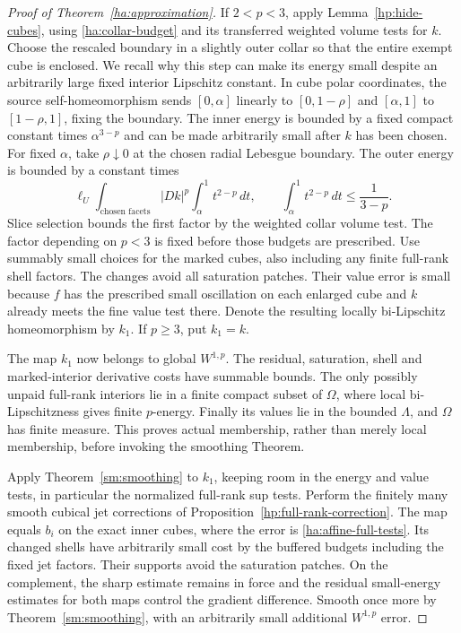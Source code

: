 \documentclass[11pt]{article}
\numberwithin{equation}{section}
\theoremstyle{definition}
\theoremstyle{remark}
\begin{document}
\begin{proof}[Proof of Theorem~\ref{ha:approximation}]
If $2<p<3$, apply Lemma~\ref{hp:hide-cubes}, using
\eqref{ha:collar-budget} and its transferred weighted volume tests
for $k$.  Choose the rescaled boundary in a slightly outer collar
so that the entire exempt cube is enclosed.  We recall why this
step can make its energy small despite an arbitrarily large fixed
interior Lipschitz constant.  In cube polar coordinates, the source
self-homeomorphism sends $[0,\alpha]$ linearly to $[0,1-\rho]$ and
$[\alpha,1]$ to $[1-\rho,1]$, fixing the boundary.  The inner energy
is bounded by a fixed compact constant times $\alpha^{3-p}$ and
can be made arbitrarily small after $k$ has been chosen.  For fixed
$\alpha$, take $\rho\downarrow0$ at the chosen radial Lebesgue
boundary.  The outer energy is bounded by a constant times
\[
 \ell_U\int_{\text{chosen facets}}|Dk|^p
                     \int_\alpha^1 t^{2-p}\,dt,
 \qquad \int_\alpha^1 t^{2-p}\,dt\le \frac{1}{3-p}.
\]
Slice selection bounds the first factor by the weighted collar
volume test.  The factor depending on $p<3$ is fixed before those
budgets are prescribed.  Use summably small choices for the marked
cubes, also including any finite full-rank shell factors.  The changes
avoid all saturation patches.  Their value error is small because
$f$ has the prescribed small oscillation on each enlarged cube and
$k$ already meets the fine value test there.  Denote the resulting
locally bi-Lipschitz homeomorphism by $k_1$.  If $p\ge3$, put
$k_1=k$.

The map $k_1$ now belongs to global $W^{1,p}$.  The residual,
saturation, shell and marked-interior derivative costs have summable
bounds.  The only possibly unpaid full-rank interiors lie in a
finite compact subset of $\Omega$, where local bi-Lipschitzness
gives finite $p$-energy.  Finally its values lie in the bounded
$\Lambda$, and $\Omega$ has finite measure.  This proves actual
membership, rather than merely local membership, before invoking
the smoothing Theorem.

Apply Theorem~\ref{sm:smoothing} to $k_1$, keeping room in the
energy and value tests, in particular the normalized full-rank
sup tests.  Perform the finitely many smooth cubical jet corrections
of Proposition~\ref{hp:full-rank-correction}.  The map equals $b_i$
on the exact inner cubes, where the error is
\eqref{ha:affine-full-tests}.  Its changed shells have arbitrarily
small cost by the buffered budgets including the fixed jet factors.
Their supports avoid the saturation patches.  On the complement,
the sharp estimate remains in force and the residual small-energy
estimates for both maps control the gradient difference.  Smooth
once more by Theorem~\ref{sm:smoothing}, with an arbitrarily small
additional $W^{1,p}$ error.


\end{proof}
\end{document}
